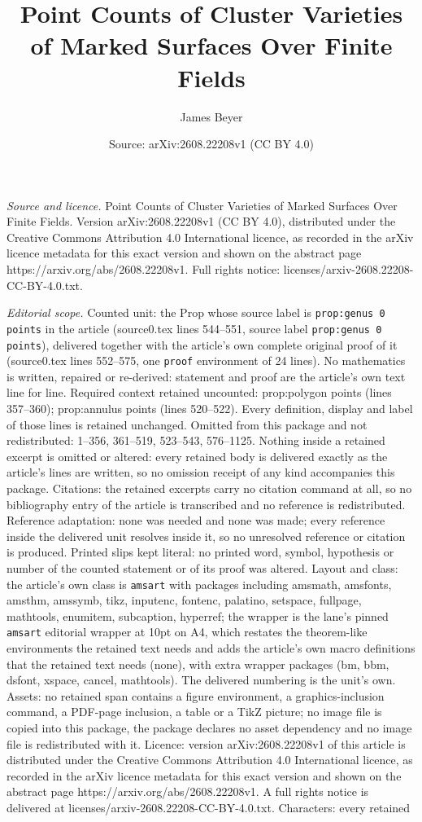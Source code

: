 \documentclass[10pt,a4paper]{amsart}
\title[Point Counts of Cluster Varieties of Marked Surfaces Over Fi]{Point Counts of Cluster Varieties of Marked Surfaces Over Finite Fields}
\author{James Beyer}
\date{Source: arXiv:2608.22208v1 (CC BY 4.0)}
\begin{document}
\maketitle

\noindent\emph{Source and licence.} Point Counts of Cluster Varieties of Marked Surfaces Over Finite Fields. Version arXiv:2608.22208v1 (CC BY 4.0), distributed under the Creative Commons Attribution 4.0 International licence, as recorded in the arXiv licence metadata for this exact version and shown on the abstract page https://arxiv.org/abs/2608.22208v1. Full rights notice: licenses/arxiv-2608.22208-CC-BY-4.0.txt.\par\smallskip

\noindent\textit{Editorial scope.} Counted unit: the Prop whose source label is \texttt{prop:genus 0 points} in the article (source0.tex lines 544--551, source label \texttt{prop:genus 0 points}), delivered together with the article's own complete original proof of it (source0.tex lines 552--575, one \texttt{proof} environment of 24 lines). No mathematics is written, repaired or re-derived: statement and proof are the article's own text line for line. Required context retained uncounted: prop:polygon points (lines 357--360); prop:annulus points (lines 520--522). Every definition, display and label of those lines is retained unchanged. Omitted from this package and not redistributed: 1--356, 361--519, 523--543, 576--1125. Nothing inside a retained excerpt is omitted or altered: every retained body is delivered exactly as the article's lines are written, so no omission receipt of any kind accompanies this package. Citations: the retained excerpts carry no citation command at all, so no bibliography entry of the article is transcribed and no reference is redistributed. Reference adaptation: none was needed and none was made; every reference inside the delivered unit resolves inside it, so no unresolved reference or citation is produced. Printed slips kept literal: no printed word, symbol, hypothesis or number of the counted statement or of its proof was altered. Layout and class: the article's own class is \texttt{amsart} with packages including amsmath, amsfonts, amsthm, amssymb, tikz, inputenc, fontenc, palatino, setspace, fullpage, mathtools, enumitem, subcaption, hyperref; the wrapper is the lane's pinned \texttt{amsart} editorial wrapper at 10pt on A4, which restates the theorem-like environments the retained text needs and adds the article's own macro definitions that the retained text needs (none), with extra wrapper packages (bm, bbm, dsfont, xspace, cancel, mathtools). The delivered numbering is the unit's own. Assets: no retained span contains a figure environment, a graphics-inclusion command, a PDF-page inclusion, a table or a TikZ picture; no image file is copied into this package, the package declares no asset dependency and no image file is redistributed with it. Licence: version arXiv:2608.22208v1 of this article is distributed under the Creative Commons Attribution 4.0 International licence, as recorded in the arXiv licence metadata for this exact version and shown on the abstract page https://arxiv.org/abs/2608.22208v1. A full rights notice is delivered at licenses/arxiv-2608.22208-CC-BY-4.0.txt. Characters: every retained 
\end{document}
